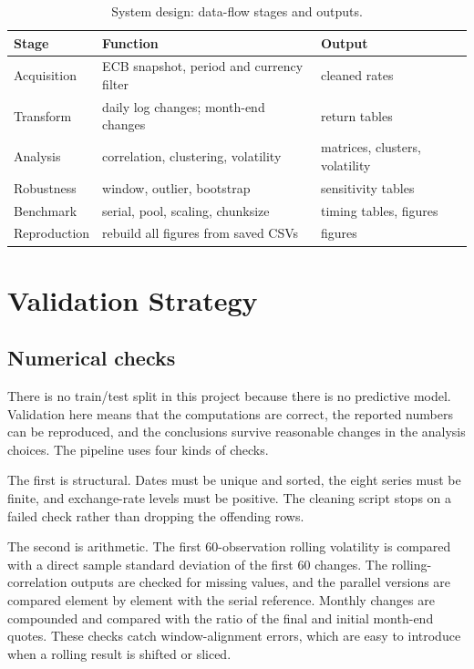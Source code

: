 \documentclass[journal]{IEEEtran}
\begin{document}
\begin{table}[t]
\caption{System design: data-flow stages and outputs.}
\label{tab:system}
\centering
\small
\renewcommand{\arraystretch}{1.15}
\begin{tabularx}{\columnwidth}{@{}l>{\raggedright\arraybackslash}X>{\raggedright\arraybackslash}X@{}}
\toprule
Stage & Function & Output \\
\midrule
Acquisition & ECB snapshot, period and currency filter & cleaned rates \\
Transform & daily log changes; month-end changes & return tables \\
Analysis & correlation, clustering, volatility & matrices, clusters, volatility \\
Robustness & window, outlier, bootstrap & sensitivity tables \\
Benchmark & serial, pool, scaling, chunksize & timing tables, figures \\
Reproduction & rebuild all figures from saved CSVs & 22 figures \\
\bottomrule
\end{tabularx}
\end{table}

\section{Validation Strategy}
\label{sec:validation}

\subsection{Numerical checks}
There is no train/test split in this project because there is no predictive model. Validation here means that the computations are correct, the reported numbers can be reproduced, and the conclusions survive reasonable changes in the analysis choices. The pipeline uses four kinds of checks.

The first is structural. Dates must be unique and sorted, the eight series must be finite, and exchange-rate levels must be positive. The cleaning script stops on a failed check rather than dropping the offending rows.

The second is arithmetic. The first 60-observation rolling volatility is compared with a direct sample standard deviation of the first 60 changes. The rolling-correlation outputs are checked for missing values, and the parallel versions are compared element by element with the serial reference. Monthly changes are compounded and compared with the ratio of the final and initial month-end quotes. These checks catch window-alignment errors, which are easy to introduce when a rolling result is shifted or sliced.
\end{document}
